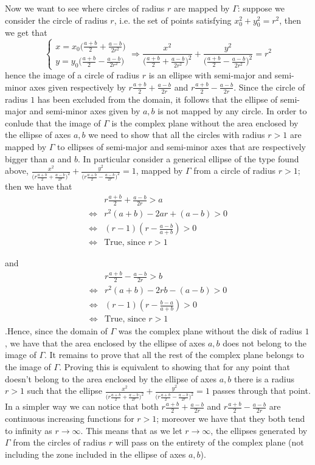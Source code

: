 \documentclass[10pt,a4paper]{book}
\begin{document}
Now we want to see where circles of radius $r$ are mapped by $\Gamma$: suppose we consider the circle of radius $r$, i.e. the set of points satisfying $x_0^2+y_0^2=r^2$, then we get that
$$\begin{cases}
x=x_0\big(\frac{a+b}{2}+\frac{a-b}{2r^2}\big)\\
y=y_0\big(\frac{a+b}{2}-\frac{a-b}{2r^2}\big)
\end{cases}\Rightarrow \frac{x^2}{\big(\frac{a+b}{2}+\frac{a-b}{2r^2}\big)^2}+\frac{y^2}{\big(\frac{a+b}{2}-\frac{a-b}{2r^2}\big)^2}=r^2$$
hence the image of a circle of radius $r$ is an ellipse with semi-major and semi-minor axes given respectively by $r\frac{a+b}{2}+\frac{a-b}{2r}$ and $r\frac{a+b}{2}-\frac{a-b}{2r}$. Since the circle of radius $1$ has been excluded from the domain, it follows that the ellipse of semi-major and semi-minor axes given by $a,b$ is not mapped by any circle. In order to conlude that the image of $\Gamma$ is the complex plane without the area enclosed by the ellipse of axes $a,b$ we need to show that all the circles with radius $r>1$ are mapped by $\Gamma$ to ellipses of semi-major and semi-minor axes that are respectively bigger than $a$ and $b$.
In particular consider a generical ellipse of the type found above, $\frac{x^2}{\big(r\frac{a+b}{2}+\frac{a-b}{2r}\big)^2}+\frac{y^2}{\big(r\frac{a+b}{2}-\frac{a-b}{2r}\big)^2}=1$, mapped by $\Gamma$ from a circle of radius $r>1$; then we have that 
\begin{align*}
&r\frac{a+b}{2}+\frac{a-b}{2r}>a\\
\Leftrightarrow & r^2(a+b)-2ar+(a-b)>0\\
\Leftrightarrow & (r-1)(r-\frac{a-b}{a+b})>0\\
\Leftrightarrow &\text{True, since }r>1
\end{align*}

and \begin{align*}
&r\frac{a+b}{2}-\frac{a-b}{2r}>b\\
\Leftrightarrow &r^2(a+b)-2rb-(a-b)>0\\
\Leftrightarrow &(r-1)(r-\frac{b-a}{a+b})>0\\
\Leftrightarrow &\text{True, since }r>1
\end{align*}.Hence, since the domain of $\Gamma$ was the complex plane without the disk of radius $1$, we have that the area enclosed by the ellipse of axes $a,b$ does not belong to the image of $\Gamma$. It remains to prove that all the rest of the complex plane belongs to the image of $\Gamma$. Proving this is equivalent  to showing that for any point that doesn't belong to the area enclosed by the ellipse of axes $a,b$ there is a radius $r>1$ such that the ellipse $\frac{x^2}{\big(r\frac{a+b}{2}+\frac{a-b}{2r}\big)^2}+\frac{y^2}{\big(r\frac{a+b}{2}-\frac{a-b}{2r}\big)^2}=1$ passes through that point. In a simpler way we can notice that both $r\frac{a+b}{2}+\frac{a-b}{2r}$ and $r\frac{a+b}{2}-\frac{a-b}{2r}$ are continuous increasing functions for $r>1$; moreover we have that they both tend to infinity as $r\to\infty$. This means that as we let $r\to\infty$, the ellipses generated by $\Gamma$ from the circles of radius $r$ will pass on the entirety of the complex plane (not including the zone included in the ellipse of axes $a,b$).
\end{document}
